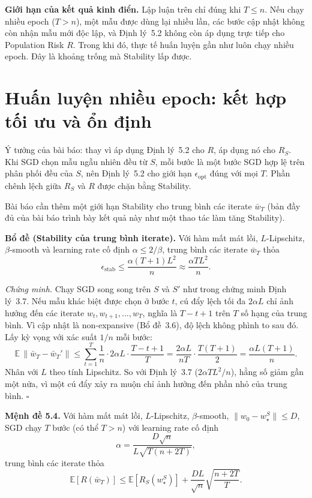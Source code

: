 \textbf{Giới hạn của kết quả kinh điển.} Lập luận trên chỉ đúng khi $T \le n$. Nếu chạy nhiều epoch ($T > n$), một mẫu được dùng lại nhiều lần, các bước cập nhật không còn nhận mẫu mới độc lập, và Định lý~5.2 không còn áp dụng trực tiếp cho Population Risk $R$. Trong khi đó, thực tế huấn luyện gần như luôn chạy nhiều epoch. Đây là khoảng trống mà Stability lấp được.

\section{Huấn luyện nhiều epoch: kết hợp tối ưu và ổn định}
\label{sec:nhieuepoch}

Ý tưởng của bài báo: thay vì áp dụng Định lý~5.2 cho $R$, áp dụng nó cho $R_S$. Khi SGD chọn mẫu ngẫu nhiên đều từ $S$, mỗi bước là một bước SGD hợp lệ trên phân phối đều của $S$, nên Định lý~5.2 cho giới hạn $\epsilon_{\mathrm{opt}}$ đúng với mọi $T$. Phần chênh lệch giữa $R_S$ và $R$ được chặn bằng Stability.

Bài báo cần thêm một giới hạn Stability cho trung bình các iterate $\bar w_T$ (bản đầy đủ của bài báo trình bày kết quả này như một thao tác làm tăng Stability).

\textbf{Bổ đề (Stability của trung bình iterate).} Với hàm mất mát lồi, $L$-Lipschitz, $\beta$-smooth và learning rate cố định $\alpha \le 2/\beta$, trung bình các iterate $\bar w_T$ thỏa
\[
\epsilon_{\mathrm{stab}} \le \frac{\alpha (T+1) L^2}{n} \approx \frac{\alpha T L^2}{n}.
\]

\textit{Chứng minh.} Chạy SGD song song trên $S$ và $S'$ như trong chứng minh Định lý~3.7. Nếu mẫu khác biệt được chọn ở bước $t$, cú đẩy lệch tối đa $2\alpha L$ chỉ ảnh hưởng đến các iterate $w_t, w_{t+1}, \ldots, w_T$, nghĩa là $T - t + 1$ trên $T$ số hạng của trung bình. Vì cập nhật là non-expansive (Bổ đề~3.6), độ lệch không phình to sau đó. Lấy kỳ vọng với xác suất $1/n$ mỗi bước:
\[
\mathbb{E}\,\|\bar w_T - \bar w_T'\| \le \sum_{t=1}^{T} \frac{1}{n}\cdot 2\alpha L \cdot \frac{T-t+1}{T} = \frac{2\alpha L}{nT}\cdot\frac{T(T+1)}{2} = \frac{\alpha L (T+1)}{n}.
\]
Nhân với $L$ theo tính Lipschitz. So với Định lý~3.7 ($2\alpha T L^2/n$), hằng số giảm gần một nửa, vì một cú đẩy xảy ra muộn chỉ ảnh hưởng đến phần nhỏ của trung bình. $\square$

\textbf{Mệnh đề 5.4.} Với hàm mất mát lồi, $L$-Lipschitz, $\beta$-smooth, $\|w_0 - w_\star^S\| \le D$, SGD chạy $T$ bước (có thể $T > n$) với learning rate cố định
\[
\alpha = \frac{D\sqrt{n}}{L\sqrt{T(n+2T)}},
\]
trung bình các iterate thỏa
\[
\boxed{
\mathbb{E}\left[R(\bar w_T)\right] \le \mathbb{E}\left[R_S(w_\star^S)\right] + \frac{DL}{\sqrt{n}}\sqrt{\frac{n + 2T}{T}}.
}
\]

